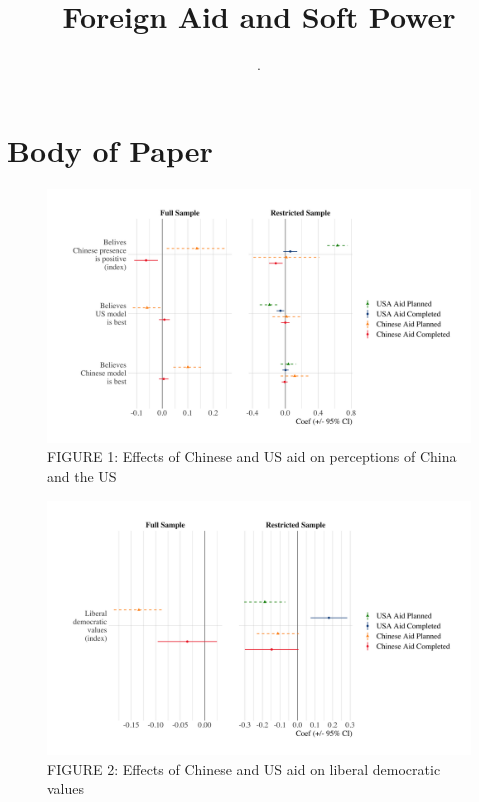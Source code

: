 \documentclass[9pt]{article}
\title{Foreign Aid and Soft Power}
\author{.}
\begin{document}
\maketitle
\tableofcontents

\setlength{\tabcolsep}{5pt}


\newpage
\section{Body of Paper}

\begin{figure}[H]
\centering
\includegraphics[width=1\textwidth]{figures/figure_01.png}
\caption{FIGURE 1: Effects of Chinese and US aid on perceptions of China and the US}
\end{figure}

\begin{figure}[H]
\centering
\includegraphics[width=1\textwidth]{figures/figure_02.png}
\caption{FIGURE 2: Effects of Chinese and US aid on liberal democratic values}
\end{figure}
\end{document}
